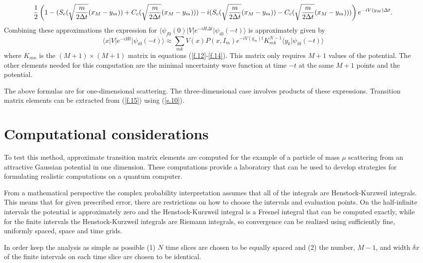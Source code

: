 \documentclass[aps,prc,reprint,noshowpacs,groupedaddress,onecolumn]{revtex4}
\def\beq{\begin{equation}}
\def\eeq{\end{equation}}
\begin{document}
\beq
{1 \over 2} \left (
1 -( 
S_{c}(\sqrt{{m \over 2\Delta t}}(x_{M}-y_m))+ 
C_{c}(\sqrt{{m \over 2\Delta t}}(x_{M}-y_m))) 
-i(
S_{c}(\sqrt{{m \over 2\Delta t}}(x_{M}-y_m))- 
C_{c}(\sqrt{{m \over 2\Delta t}}(x_{M}-y_m)))
\right )
e^{ -i V(y_{M}) \Delta t} .
\label{f.14}
\eeq
Combining these approximations the expression for 
$\langle \psi_{f0} (0) \vert V \vert e^{-i H \Delta t} \vert \psi_{i0} (-t) \rangle$
is approximately given by
\beq
\langle x \vert  V \vert e^{-i H t} \vert \psi_{i0} (-t) \rangle \approx
\sum_{mk}
V(x)P(x,I_m)e^{-i V(y_m) t}K^{N-1}_{mk}
\langle y_{k} \vert \psi_{i0} (-t)\rangle 
\label{f.15}
\eeq
where $K_{mn}$ is the $(M+1)\times (M+1)$ matrix in equations
(\ref{f.12}-\ref{f.14}).  This matrix only requires $M+1$ values of the
potential.  The other elements needed for this computation are
the minimal uncertainty wave function at time $-t$ at the
same $M+1$ points and the potential.  

The above formulas are for one-dimensional scattering.  The
three-dimensional case involves products of these expressions.
Transition matrix elements can be extracted from (\ref{f.15}) using
(\ref{s.10}).  

\section{Computational considerations}

To test this method, approximate transition matrix elements are
computed for the example of a particle of mass $\mu$ scattering from
an attractive Gaussian potential in one dimension.  These computations
provide a laboratory that can be used to develop strategies for
formulating realistic computations on a quantum computer.

From a mathematical perspective the complex probability interpretation
assumes that all of the integrals are Henstock-Kurzweil integrals.
This means that for given prescribed error, there are restrictions on
how to choose the intervals and evaluation points.  On the 
half-infinite intervals the potential is approximately zero and the
Henstock-Kurzweil integral is a Fresnel integral that can be computed
exactly, while for the finite intervals the Henstock-Kurzweil
integrals are Riemann integrals, so convergence can be realized using
sufficiently fine, uniformly spaced, space and time grids.

In order keep the analysis as simple as possible (1) $N$ time slices
are chosen to be equally spaced and (2) the number, $M-1$, and width
$\delta x$ of the finite intervals on each time slice are chosen to be
identical.
\end{document}
